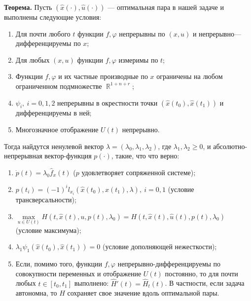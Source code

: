 \documentclass[a4paper,12pt]{scrartcl}
\DeclareMathOperator{\bbr}{\mathbb{R}}
\begin{document}
\textbf{Теорема.} Пусть $(\hat{x}(\cdot), \hat{u}(\cdot))$ --- оптимальная пара в нашей задаче и выполнены следующие условия:
\begin{enumerate}
 \item Для почти любого $t$ функции $f,\varphi$ непрерывны по $(x,u)$ и непрерывно---дифференцируемы по $x$;
 \item Для любых $(x,u)$ функции $f,\varphi$ измеримы по $t$;
 \item Функции $f,\varphi$ и их частные производные по $x$ ограничены на любом ограниченном подмножестве $\bbr^{1+n+r}$;
 \item $\psi_i,\ i=0,1,2$ непрерывны в окрестности точки $(\hat{x}(t_0),\hat{x}(t_1))$ и дифференцируемы в ней;
 \item Многозначное отображение $U(t)$ непрерывно.
\end{enumerate}
 Тогда найдутся ненулевой вектор $\lambda= (\lambda_0,\lambda_1,\lambda_2)$, где $\lambda_1,\lambda_2 \geqslant 0$, и абсолютно-непрерывная вектор-функция $p(\cdot)$, такие, что что верно:
\begin{enumerate}
 \item $\dot{p}(t) = \lambda_0\hat{f}_x(t)$ ($p$ удовлетворяет сопряженной системе);
 \item $p(t_i) = (-1)^il_{x_i}(\hat{x}(t_0),\hat{x}(t_1),\lambda),\ i =0,1$ (условие трансверсальности);
 \item $\max\limits_{u\in U(t)}H(t,\hat{x}(t),u,p(t),\lambda_0) = H(t,\hat{x}(t),\hat{u}(t),p(t),\lambda_0)$ (условие максимума);
 \item $\lambda_1\psi_1(\hat{x}(t_0),\hat{x}(t_1)) = 0$ (условие дополняющей нежесткости);
 \item Если, помимо того, функции $f,\varphi$ непрерывно-дифференцируемы по совокупности переменных и отображение $U(t)$ постоянно, то для почти любых $t\in[t_0,t_1]$ выполнено: $\hat{H}'(t) = \hat{H}_t(t)$. В частности, если задача автономна, то $H$ сохраняет свое значение вдоль оптимальной пары.
\end{enumerate}
\end{document}
